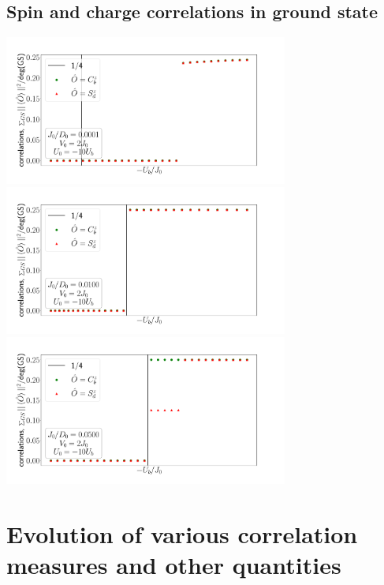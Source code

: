 \documentclass{report}
\numberwithin{equation}{section}
\begin{document}
\subsection*{Spin and charge correlations in ground state}
\begin{center}
	\includegraphics[width=0.7\textwidth]{../figures/corrs_gs-J=0.100.pdf}\\
	\includegraphics[width=0.7\textwidth]{../figures/corrs_gs-J=10.000.pdf}\\
	\includegraphics[width=0.7\textwidth]{../figures/corrs_gs-J=50.000.pdf}
\end{center}


\section{Evolution of various correlation measures and other quantities}
\end{document}
